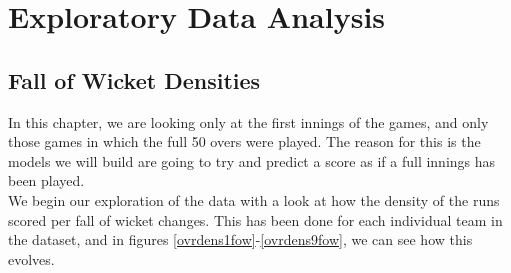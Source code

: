\chapter{Exploratory Data Analysis}

\section{Fall of Wicket Densities}

In this chapter, we are looking only at the first innings of the games, and only those games in which the full 50 overs were played. The 
reason for this is the models we will build are going to try and predict a score as if a full innings has been played. \\

We begin our exploration of the data with a look at how the density of the runs scored per fall of wicket changes. This has been done for each
individual team in the dataset, and in figures \ref{ovrdens1fow}-\ref{ovrdens9fow}, we can see how this evolves.  

